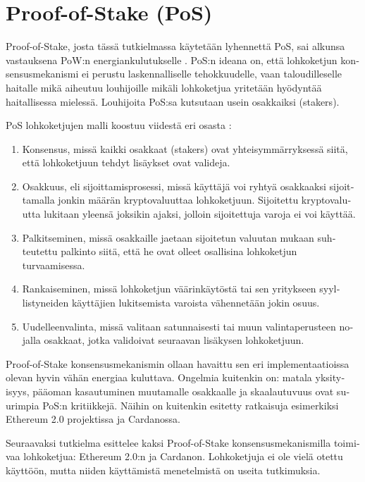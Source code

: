 \section{Proof-of-Stake (PoS)\label{pos}}

\begin{otherlanguage}{english}

Proof-of-Stake, josta tässä tutkielmassa käytetään lyhennettä PoS, sai alkunsa vastauksena PoW:n energiankulutukselle \cite{pos2}. PoS:n ideana on, että lohkoketjun konsensusmekanismi ei perustu laskennalliselle tehokkuudelle, vaan taloudilleselle haitalle mikä aiheutuu louhijoille mikäli lohkoketjua yritetään hyödyntää haitallisessa mielessä. Louhijoita PoS:sa kutsutaan usein osakkaiksi (stakers).

PoS lohkoketjujen malli koostuu viidestä eri osasta \cite{pos1, pos2}:

\begin{enumerate}
\item Konsensus, missä kaikki osakkaat (stakers) ovat yhteisymmärryksessä siitä, että lohkoketjuun tehdyt lisäykset ovat valideja.
\item Osakkuus, eli sijoittamisprosessi, missä käyttäjä voi ryhtyä osakkaaksi sijoittamalla jonkin määrän kryptovaluuttaa lohkoketjuun. Sijoitettu kryptovaluutta lukitaan yleensä joksikin ajaksi, jolloin sijoitettuja varoja ei voi käyttää.
\item Palkitseminen, missä osakkaille jaetaan sijoitetun valuutan mukaan suhteutettu palkinto siitä, että he ovat olleet osallisina lohkoketjun turvaamisessa.
\item Rankaiseminen, missä lohkoketjun väärinkäytöstä tai sen yritykseen syyllistyneiden käyttäjien lukitsemista varoista vähennetään jokin osuus.
\item Uudelleenvalinta, missä valitaan satunnaisesti tai muun valintaperusteen nojalla osakkaat, jotka validoivat seuraavan lisäkysen lohkoketjuun.
\end{enumerate}

Proof-of-Stake konsensusmekanismin ollaan havaittu sen eri implementaatioissa olevan hyvin vähän energiaa kuluttava. Ongelmia kuitenkin on: matala yksityisyys, pääoman kasautuminen muutamalle osakkaalle ja skaalautuvuus ovat suurimpia PoS:n kritiikkejä. Näihin on kuitenkin esitetty ratkaisuja esimerkiksi Ethereum 2.0 projektissa ja Cardanossa.

Seuraavaksi tutkielma esittelee kaksi Proof-of-Stake konsensusmekanismilla toimivaa lohkoketjua: Ethereum 2.0:n ja Cardanon. Lohkoketjuja ei ole vielä otettu käyttöön, mutta niiden käyttämistä menetelmistä on useita tutkimuksia.





\end{otherlanguage}